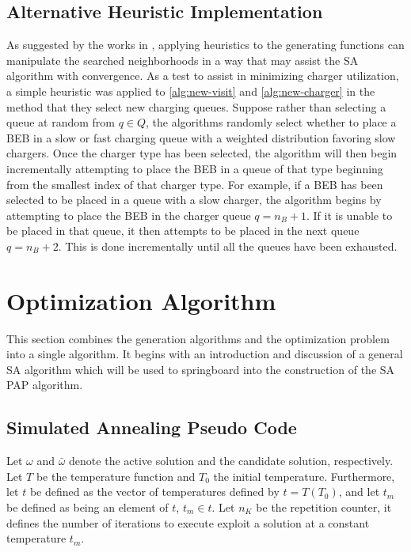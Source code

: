 \documentclass[11pt,a4paper,final]{article}
\newcommand{\Tau}{T}                        %
\begin{document}
\subsection{Alternative Heuristic Implementation}
\label{sec:heuristic-implementation}
As suggested by the works in \cite{Zhang_2010,Xinchao_2011}, applying heuristics to the generating functions can
manipulate the searched neighborhoods in a way that may assist the SA algorithm with convergence. As a test to assist in
minimizing charger utilization, a simple heuristic was applied to \ref{alg:new-visit} and \ref{alg:new-charger} in the
method that they select new charging queues. Suppose rather than selecting a queue at random from \(q \in Q\), the
algorithms randomly select whether to place a BEB in a slow or fast charging queue with a weighted distribution favoring
slow chargers. Once the charger type has been selected, the algorithm will then begin incrementally attempting to place
the BEB in a queue of that type beginning from the smallest index of that charger type. For example, if a BEB has been
selected to be placed in a queue with a slow charger, the algorithm begins by attempting to place the BEB in the charger
queue \(q = n_B + 1\). If it is unable to be placed in that queue, it then attempts to be placed in the next queue \(q =
n_B + 2\). This is done incrementally until all the queues have been exhausted.
\section{Optimization Algorithm}
\label{sec:optimization-algorithm}
This section combines the generation algorithms and the optimization problem into a single algorithm. It begins with an
introduction and discussion of a general SA algorithm which will be used to springboard into the construction of the SA
PAP algorithm.

\subsection{Simulated Annealing Pseudo Code}
\label{sec:simulated-annealing-pseudo-code}
Let \(\omega\) and \(\bar{\omega}\) denote the active solution and the candidate solution, respectively. Let \(\Tau\) be the temperature
function and \(\Tau_0\) the initial temperature. Furthermore, let \(t\) be defined as the vector of temperatures defined by
\(t = \Tau(\Tau_0)\), and let \(t_m\) be defined as being an element of \(t\), \(t_m \in t\). Let \(n_K\) be the repetition counter,
it defines the number of iterations to execute exploit a solution at a constant temperature \(t_m\).
\end{document}
